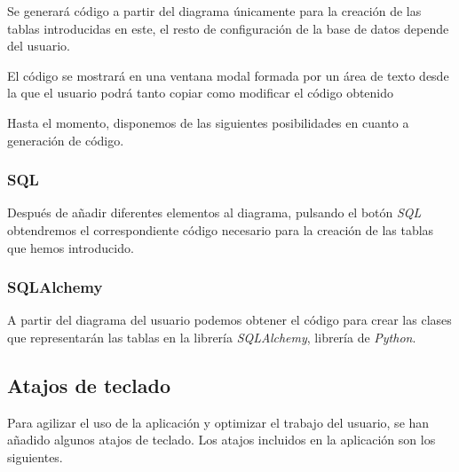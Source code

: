 Se generará código a partir del diagrama únicamente para la creación de las tablas introducidas en este, el resto de configuración de la base de datos depende del usuario.

El código se mostrará en una ventana modal formada por un área de texto desde la que el usuario podrá tanto copiar como modificar el código obtenido

Hasta el momento, disponemos de las siguientes posibilidades en cuanto a generación de código.

\subsubsection{SQL}

Después de añadir diferentes elementos al diagrama, pulsando el botón \emph{SQL} obtendremos el correspondiente código necesario para la creación de las tablas que hemos introducido.

\subsubsection{SQLAlchemy}

A partir del diagrama del usuario podemos obtener el código para crear las clases que representarán las tablas en la librería \emph{SQLAlchemy}, librería de \emph{Python}.

\subsection{Atajos de teclado}

Para agilizar el uso de la aplicación y optimizar el trabajo del usuario, se han añadido algunos atajos de teclado. Los atajos incluidos en la aplicación son los siguientes.

